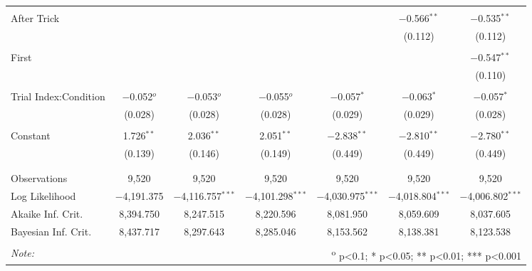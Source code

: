 \begin{table}
\begin{tabular}{@{\extracolsep{5pt}}lcccccc}
  & & & & & & \\
 After Trick &  &  &  &  & $-$0.566$^{**}$ & $-$0.535$^{**}$ \\
  &  &  &  &  & (0.112) & (0.112) \\
  & & & & & & \\
 First &  &  &  &  &  & $-$0.547$^{**}$ \\
  &  &  &  &  &  & (0.110) \\
  & & & & & & \\
 Trial Index:Condition & $-$0.052$^{o}$ & $-$0.053$^{o}$ & $-$0.055$^{o}$ & $-$0.057$^{*}$ & $-$0.063$^{*}$ & $-$0.057$^{*}$ \\
  & (0.028) & (0.028) & (0.028) & (0.029) & (0.029) & (0.028) \\
  & & & & & & \\
 Constant & 1.726$^{**}$ & 2.036$^{**}$ & 2.051$^{**}$ & $-$2.838$^{**}$ & $-$2.810$^{**}$ & $-$2.780$^{**}$ \\
  & (0.139) & (0.146) & (0.149) & (0.449) & (0.449) & (0.449) \\
  & & & & & & \\
\hline \\[-1.8ex]
Observations & 9,520 & 9,520 & 9,520 & 9,520 & 9,520 & 9,520 \\
Log Likelihood & $-$4,191.375 & $-$4,116.757$^{***}$ & $-$4,101.298$^{***}$ & $-$4,030.975$^{***}$ & $-$4,018.804$^{***}$ & $-$4,006.802$^{***}$ \\
Akaike Inf. Crit. & 8,394.750 & 8,247.515 & 8,220.596 & 8,081.950 & 8,059.609 & 8,037.605 \\
Bayesian Inf. Crit. & 8,437.717 & 8,297.643 & 8,285.046 & 8,153.562 & 8,138.381 & 8,123.538 \\
\hline
\hline \\[-1.8ex]
\textit{Note:}  & \multicolumn{6}{r}{	\textsuperscript{o} p<0.1; * p<0.05; ** p<0.01; *** p<0.001} \\
\end{tabular}
\end{table}
